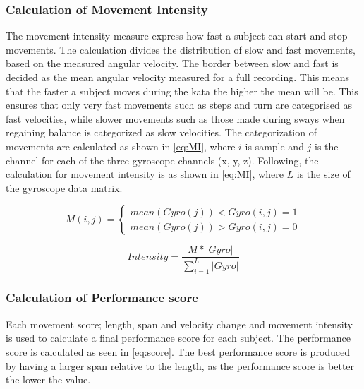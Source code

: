 \subsubsection{Calculation of Movement Intensity}
The movement intensity measure express how fast a subject can start and stop movements. The calculation divides the distribution of slow and fast movements, based on the measured angular velocity. The border between slow and fast is decided as the mean angular velocity measured for a full recording. This means that the faster a subject moves during the kata the higher the mean will be. This ensures that only very fast movements such as steps and turn are categorised as fast velocities, while slower movements such as those made during sways when regaining balance is categorized as slow velocities. The categorization of movements are calculated as shown in \eqref{eq:MI}, where $i$ is sample and $j$ is the channel for each of the three gyroscope channels (x, y, z). Following, the calculation for movement intensity is as shown in \eqref{eq:MI}, where $L$ is the size of the gyroscope data matrix.

\begin{equation} \label{eq:category}
M(i,j) = \left \{
\begin{matrix}
{mean(Gyro(j)) < Gyro(i,j) = 1}\\{mean(Gyro(j)) > Gyro(i,j) = 0}
\end{matrix} \right.
\end{equation}



%


\begin{equation} \label{eq:MI}
Intensity = \frac{M*\left| Gyro\right| }{\sum_{i=1}^{L}\left| Gyro\right| }
\end{equation}


\subsubsection{Calculation of Performance score}
Each movement score; length, span and velocity change and movement intensity is used to calculate a final performance score for each subject. 
The performance score is calculated as seen in \eqref{eq:score}. The best performance score is produced by having a larger span relative to the length, as the performance score is better the lower the value. %

